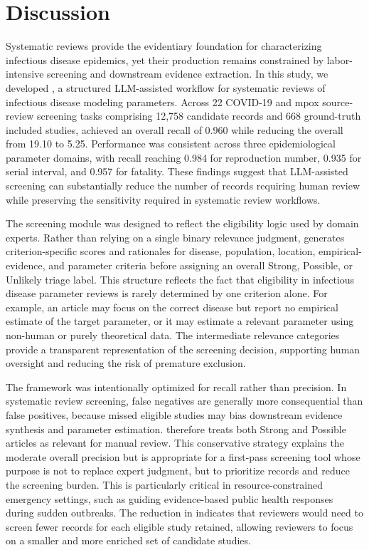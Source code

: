 \section{Discussion}

Systematic reviews provide the evidentiary foundation for characterizing infectious disease epidemics, yet their production remains constrained by labor-intensive screening and downstream evidence extraction. In this study, we developed \metagent{}, a structured LLM-assisted workflow for systematic reviews of infectious disease modeling parameters. Across 22 COVID-19 and mpox source-review screening tasks comprising 12,758 candidate records and 668 ground-truth included studies, \metagent{} achieved an overall recall of 0.960 while reducing the overall \nns{} from 19.10 to 5.25. Performance was consistent across three epidemiological parameter domains, with recall reaching 0.984 for reproduction number, 0.935 for serial interval, and 0.957 for fatality. These findings suggest that LLM-assisted screening can substantially reduce the number of records requiring human review while preserving the sensitivity required in systematic review workflows.

The screening module was designed to reflect the eligibility logic used by domain experts. Rather than relying on a single binary relevance judgment, \metagent{} generates criterion-specific scores and rationales for disease, population, location, empirical-evidence, and parameter criteria before assigning an overall Strong, Possible, or Unlikely triage label. This structure reflects the fact that eligibility in infectious disease parameter reviews is rarely determined by one criterion alone. For example, an article may focus on the correct disease but report no empirical estimate of the target parameter, or it may estimate a relevant parameter using non-human or purely theoretical data. The intermediate relevance categories provide a transparent representation of the screening decision, supporting human oversight and reducing the risk of premature exclusion.

The framework was intentionally optimized for recall rather than precision. In systematic review screening, false negatives are generally more consequential than false positives, because missed eligible studies may bias downstream evidence synthesis and parameter estimation. \metagent{} therefore treats both Strong and Possible articles as relevant for manual review. This conservative strategy explains the moderate overall precision but is appropriate for a first-pass screening tool whose purpose is not to replace expert judgment, but to prioritize records and reduce the screening burden. This is particularly critical in resource-constrained emergency settings, such as guiding evidence-based public health responses during sudden outbreaks. The reduction in \nns{} indicates that reviewers would need to screen fewer records for each eligible study retained, allowing reviewers to focus on a smaller and more enriched set of candidate studies.

